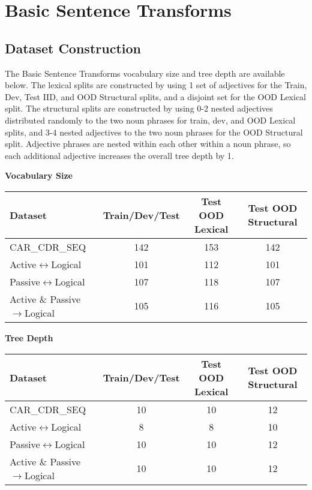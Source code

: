 \vskip 0.15in

\section{Basic Sentence Transforms}

\subsection{Dataset Construction} \label{sec:dtm-dataset-construction}
The Basic Sentence Transforms vocabulary size and tree depth are available below. The lexical splits are constructed by using 1 set of adjectives for the Train, Dev, Test IID, and OOD Structural splits, and a disjoint set for the OOD Lexical split. The structural splits are constructed by using 0-2 nested adjectives distributed randomly to the two noun phrases for train, dev, and OOD Lexical splits, and 3-4 nested adjectives to the two noun phrases for the OOD Structural split. Adjective phrases are nested within each other within a noun phrase, so each additional adjective increases the overall tree depth by 1.

\textbf{Vocabulary Size}
\begin{table}[H]
\begin{center}
\begin{sc}
\begin{tabular}{lccc}
\toprule
Dataset & Train/Dev/Test & Test OOD Lexical & Test OOD Structural \\
\midrule
CAR\_CDR\_SEQ & 142 & 153 & 142 \\
Active$\leftrightarrow$Logical & 101 & 112 & 101 \\
Passive$\leftrightarrow$Logical & 107 & 118 & 107 \\
Active \& Passive$\rightarrow$Logical & 105 & 116 & 105 \\
\bottomrule
\end{tabular}
\end{sc}
\end{center}
\vskip -0.1in
\end{table}

\textbf{Tree Depth}
\begin{table}[H]
\begin{center}
\begin{sc}
\begin{tabular}{lccc}
\toprule
Dataset & Train/Dev/Test & Test OOD Lexical & Test OOD Structural \\
\midrule
CAR\_CDR\_SEQ & 10 & 10 & 12 \\
Active$\leftrightarrow$Logical & 8 & 8 & 10 \\
Passive$\leftrightarrow$Logical & 10 & 10 & 12 \\
Active \& Passive$\rightarrow$Logical & 10 & 10 & 12 \\
\bottomrule
\end{tabular}
\end{sc}
\end{center}
\vskip -0.1in
\end{table}


